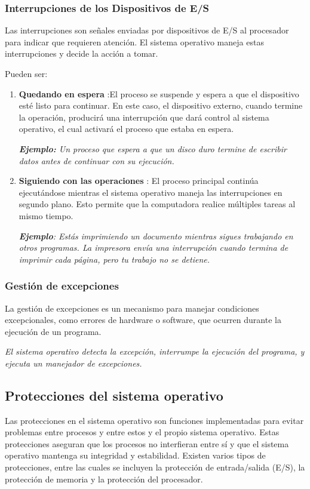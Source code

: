 \subsubsection{Interrupciones de los Dispositivos de E/S}
Las interrupciones son señales enviadas por dispositivos de E/S al procesador para indicar que requieren atención. El sistema operativo maneja estas interrupciones y decide la acción a tomar.

Pueden ser:
	\begin{tcolorbox}
	\begin{enumerate}
		\item\textbf{Quedando en espera }:El proceso se suspende y espera a que el dispositivo esté listo para continuar. En este caso, el dispositivo externo, cuando termine la operación, producirá una interrupción que dará control al sistema operativo, el cual activará el proceso que estaba en espera.
		
	
		\textit{ \textbf{Ejemplo:} Un proceso que espera a que un disco duro termine de escribir datos antes de continuar con su ejecución.}
		
		\item\textbf{Siguiendo con las operaciones }:  El proceso principal continúa ejecutándose mientras el sistema operativo maneja las interrupciones en segundo plano. Esto permite que la computadora realice múltiples tareas al mismo tiempo.
		
	
		\textit{\textbf{Ejemplo}: Estás imprimiendo un documento mientras sigues trabajando en otros programas. La impresora envía una interrupción cuando termina de imprimir cada página, pero tu trabajo no se detiene. }
		
	
		
		
	\end{enumerate}
	
	
\end{tcolorbox}

\subsubsection{Gestión de excepciones}
La gestión de excepciones es un mecanismo para manejar condiciones excepcionales, como errores de hardware o software, que ocurren durante la ejecución de un programa.

\textit{El sistema operativo detecta la excepción, interrumpe la ejecución del programa, y ejecuta un manejador de excepciones.
}

\subsection{Protecciones del sistema operativo}
Las protecciones en el sistema operativo son funciones implementadas para evitar problemas entre procesos y entre estos y el propio sistema operativo. Estas protecciones aseguran que los procesos no interfieran entre sí y que el sistema operativo mantenga su integridad y estabilidad. Existen varios tipos de protecciones, entre las cuales se incluyen la protección de entrada/salida (E/S), la protección de memoria y la protección del procesador.


